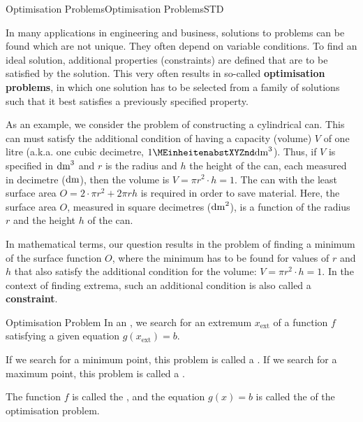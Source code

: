 \begin{MXContent}{Optimisation Problems}{Optimisation Problems}{STD}


In many applications in engineering and business, solutions to problems can be found which are not unique. 
They often depend on variable conditions. To find an ideal solution, additional properties (constraints)
are defined that are to be satisfied by the solution. This very often results in so-called 
\textbf{optimisation problems}, in which one solution has to be selected from a family of solutions such that it 
best satisfies a previously specified property.

As an example, we consider the problem of constructing a cylindrical can. This can must satisfy the 
additional condition of having a capacity (volume) $V$ of one litre (a.k.a. one cubic decimetre, $1 \MEinheit{dm}^3$).
Thus, if $V$ is specified in $\MEinheit[]{dm}^3$ and $r$ is the radius and $h$ the height of the can, 
each measured in decimetre ($\MEinheit[]{dm}$), then the volume is $V = \pi r^2 \cdot h = 1$.
The can with the least surface area $O = 2 \cdot \pi r^2 + 2 \pi r h$ is required in order to save material.
Here, the surface area $O$, measured in square decimetres ($\MEinheit[]{dm}^2$), is a function of the 
radius $r$ and the height $h$ of the can. 

In mathematical terms, our question results in the problem of finding a minimum 
of the surface function $O$, where the minimum has to be found for values of $r$ and $h$ that also satisfy the 
additional condition for the volume: $V = \pi r^2 \cdot h = 1$. In the context of finding extrema, 
such an additional condition is also called a \textbf{constraint}.

\begin{MXInfo}{Optimisation Problem}
In an , we search for an 
extremum $x_{\text{ext}}$ of a function $f$ satisfying a given equation 
$g(x_{\text{ext}}) = b$.

If we search for a minimum point, this problem is called a . 
If we search for a maximum point, this problem is called a .  

The function $f$ is called the , and the equation $g(x) = b$
is called the  of the optimisation problem.
\end{MXInfo}
\end{MXContent}

